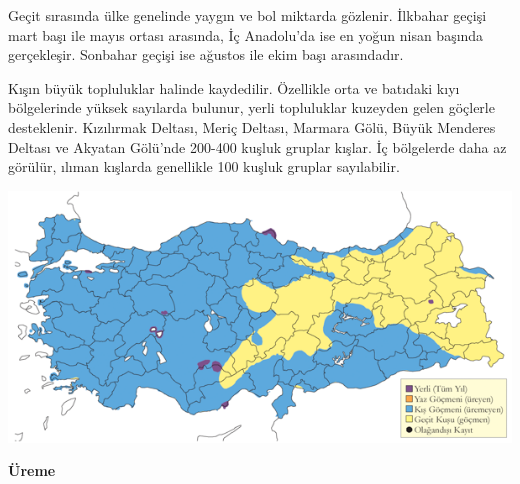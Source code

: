 \documentclass[
  a4paper,
  DIV=11,
  numbers=noendperiod]{scrreprt}
\begin{document}
Geçit sırasında ülke genelinde yaygın ve bol miktarda gözlenir. İlkbahar
geçişi mart başı ile mayıs ortası arasında, İç Anadolu'da ise en yoğun
nisan başında gerçekleşir. Sonbahar geçişi ise ağustos ile ekim başı
arasındadır.

Kışın büyük topluluklar halinde kaydedilir. Özellikle orta ve batıdaki
kıyı bölgelerinde yüksek sayılarda bulunur, yerli topluluklar kuzeyden
gelen göçlerle desteklenir. Kızılırmak Deltası, Meriç Deltası, Marmara
Gölü, Büyük Menderes Deltası ve Akyatan Gölü'nde 200-400 kuşluk gruplar
kışlar. İç bölgelerde daha az görülür, ılıman kışlarda genellikle 100
kuşluk gruplar sayılabilir.

\includegraphics{images/harita_Page_071.png}

\textbf{Üreme}
\end{document}
